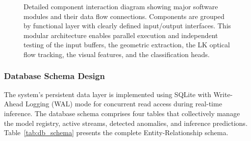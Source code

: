 \documentclass[12pt]{article}
\begin{document}
\begin{figure}[H]
{
    }%
    \caption{Detailed component interaction diagram showing major software modules and their data flow connections. Components are grouped by functional layer with clearly defined input/output interfaces. This modular architecture enables parallel execution and independent testing of the input buffers, the geometric extraction, the LK optical flow tracking, the visual features, and the classification heads.}
    \label{fig:component_diagram}
\end{figure}

\subsubsection{Database Schema Design}

The system's persistent data layer is implemented using SQLite with Write-Ahead Logging (WAL) mode for concurrent read access during real-time inference. The database schema comprises four tables that collectively manage the model registry, active streams, detected anomalies, and inference predictions. Table~\ref{tab:db_schema} presents the complete Entity-Relationship schema.
\end{document}
